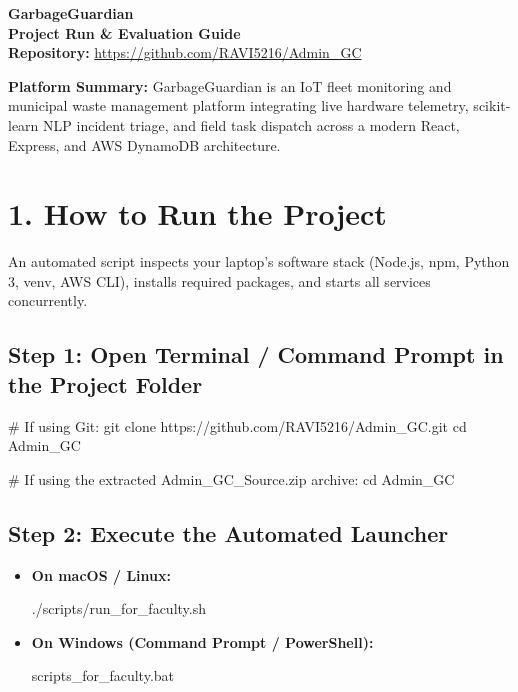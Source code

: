 \documentclass[11pt,a4paper]{article}
\begin{document}
\begin{center}
    {\huge \bfseries \color{primary} GarbageGuardian}\\[0.3em]
    {\large \bfseries \color{secondary} Project Run \& Evaluation Guide}\\[0.4em]
    {\small \color{darkgray} \textbf{Repository:} \url{https://github.com/RAVI5216/Admin_GC}}
\end{center}
\vspace{0.3em}

\noindent\textbf{Platform Summary:} GarbageGuardian is an IoT fleet monitoring and municipal waste management platform integrating live hardware telemetry, scikit-learn NLP incident triage, and field task dispatch across a modern React, Express, and AWS DynamoDB architecture.

\vspace{0.6em}

\section*{1. How to Run the Project}
An automated script inspects your laptop's software stack (Node.js, npm, Python 3, venv, AWS CLI), installs required packages, and starts all services concurrently.

\subsection*{Step 1: Open Terminal / Command Prompt in the Project Folder}
\begin{codebox}
# If using Git:
git clone https://github.com/RAVI5216/Admin_GC.git
cd Admin_GC

# If using the extracted Admin_GC_Source.zip archive:
cd Admin_GC
\end{codebox}

\subsection*{Step 2: Execute the Automated Launcher}
\begin{itemize}
    \item \textbf{On macOS / Linux:}
    \begin{codebox}
    ./scripts/run_for_faculty.sh
    \end{codebox}
    \item \textbf{On Windows (Command Prompt / PowerShell):}
    \begin{codebox}
    scripts\run_for_faculty.bat
    \end{codebox}
\end{itemize}
\end{document}
